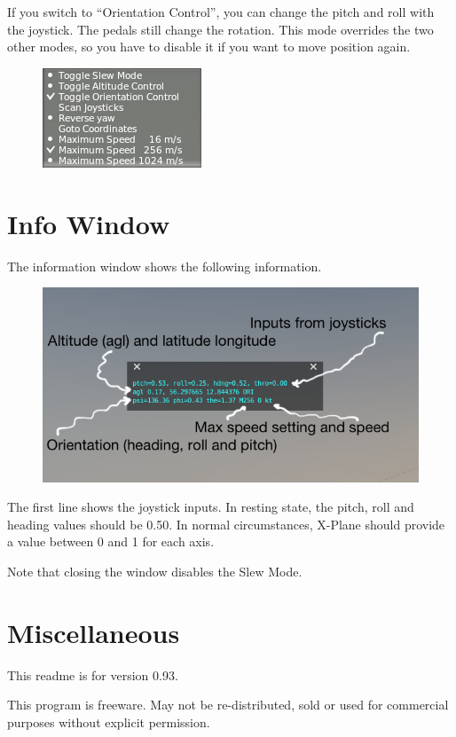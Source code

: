 \documentclass[a4paper,12pt]{article}
\begin{document}
\vspace{0.5\baselineskip}
If you switch to ``Orientation Control'', you can change the pitch and
roll with the joystick. The pedals still change the rotation. This
mode overrides the two other modes, so you have to disable it if you
want to move position again.

\begin{figure}[h!]%
\centering
\includegraphics[scale=1]{sleworientation.png}
\label{fig:infowindow}
\end{figure}

\clearpage
\section*{Info Window}

The information window shows the following information. 

\begin{figure}[h!]%
\centering
\includegraphics[width=1.0\textwidth]{infowindow.png}
\label{fig:infowindow}
\end{figure}

The first line shows the joystick inputs. In resting state, the pitch, roll and
heading values should be 0.50. In normal circumstances, X-Plane should provide a
value between 0 and 1 for each axis.

Note that closing the window disables the Slew Mode.

\section*{Miscellaneous}

This readme is for version 0.93. 

\vspace{0.5\baselineskip} {\color{text1}This program is freeware. May not be
  re-distributed, sold or used for commercial purposes without explicit
  permission.}
\end{document}
